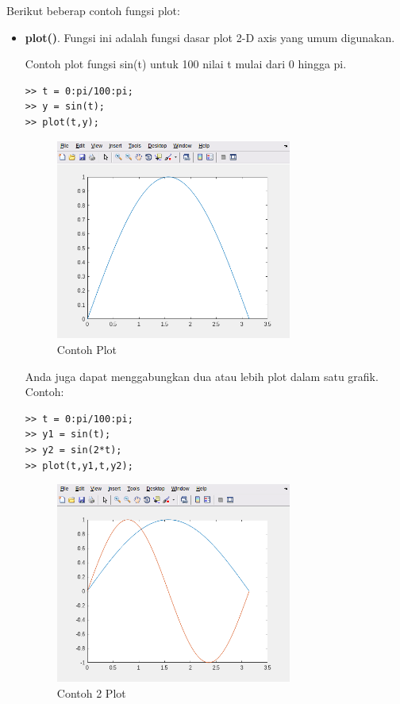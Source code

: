 \documentclass[12pt]{book}
\begin{document}
	Berikut beberap contoh fungsi plot:
	\begin{itemize}
		\item \textbf{plot()}. Fungsi ini adalah fungsi dasar plot 2-D axis yang umum digunakan.
		
		Contoh plot fungsi sin(t) untuk 100 nilai t mulai dari 0 hingga pi.
		\begin{verbatim}
>> t = 0:pi/100:pi;
>> y = sin(t);
>> plot(t,y);
		\end{verbatim}
	
		\newpage
		\begin{figure}[!ht]
			\centering
			\includegraphics[width=220pt]{images/plot1}
			\caption{Contoh Plot}
		\end{figure}
	
		Anda juga dapat menggabungkan dua atau lebih plot dalam satu grafik.
		Contoh:
		\begin{verbatim}
>> t = 0:pi/100:pi;
>> y1 = sin(t);
>> y2 = sin(2*t);
>> plot(t,y1,t,y2);
		\end{verbatim}
	
		\begin{figure}[!ht]
			\centering
			\includegraphics[width=220pt]{images/plot2}
			\caption{Contoh 2 Plot}
		\end{figure}
	

\end{itemize}
\end{document}
